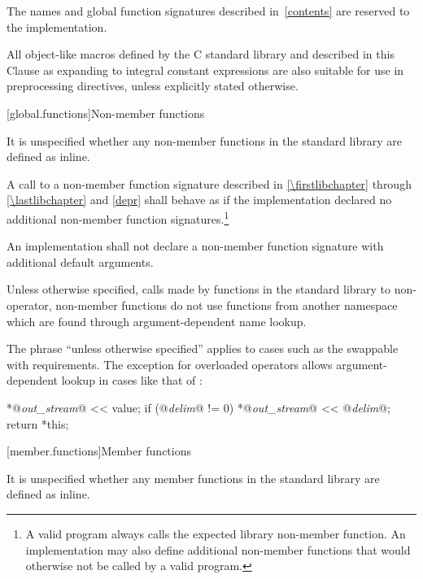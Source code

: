 \pnum
The names and global function signatures described in~\ref{contents} are
reserved to the implementation.
%
%
%
%
%

\pnum
All object-like macros defined by the C standard library and described in this
Clause as expanding to integral constant expressions are also suitable for use
in  preprocessing directives, unless
explicitly stated otherwise.

[global.functions]{Non-member functions}

\pnum
It is unspecified whether any
non-member
functions in the \Cpp{} standard library are defined as
inline.

\pnum
A call to a non-member function signature
described in \ref{\firstlibchapter} through \ref{\lastlibchapter} and
\ref{depr} shall behave as if the implementation declared no additional
non-member function signatures.\footnote{A valid \Cpp{} program always
calls the expected library non-member function. An implementation may
also define additional non-member functions that would otherwise not
be called by a valid \Cpp{} program.}

\pnum
An implementation shall not declare a non-member function signature
with additional default arguments.

\pnum
Unless otherwise specified,
calls made by functions in the standard library to non-operator, non-member functions
do not use functions from another namespace which are found through
argument-dependent name lookup.
\begin{note}
The phrase ``unless otherwise specified'' applies to cases such as
the swappable with requirements.
The exception for overloaded operators allows argument-dependent lookup
in cases like that of
:

\effects
\begin{codeblock}
*@\textit{out_stream}@ << value;
if (@\textit{delim}@ != 0)
  *@\textit{out_stream}@ << @\textit{delim}@;
return *this;
\end{codeblock}
\end{note}

[member.functions]{Member functions}

\pnum
It is unspecified whether any member functions in the \Cpp{} standard library are defined as
inline.

